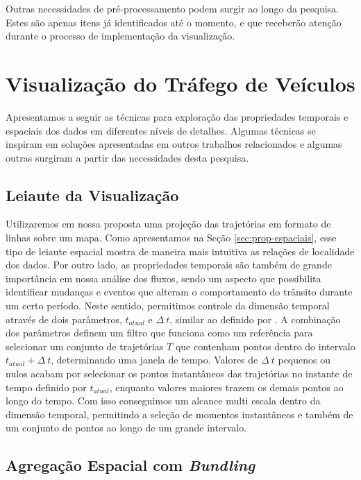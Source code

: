   Outras necessidades de pré-processamento podem surgir ao longo da pesquisa.
Estes são apenas itens já identificados até o momento, e que receberão atenção
durante o processo de implementação da visualização.

\section{Visualização do Tráfego de Veículos}

  Apresentamos a seguir as técnicas para exploração das propriedades temporais
e espaciais dos dados em diferentes níveis de detalhes. Algumas técnicas se
inspiram em soluções apresentadas em outros trabalhos relacionados e algumas
outras surgiram a partir das necessidades desta pesquisa.

\subsection{Leiaute da Visualização}
  
  Utilizaremos em nossa proposta uma projeção das trajetórias em formato de
linhas sobre um mapa.  Como apresentamos na Seção \ref{sec:prop-espaciais},
esse tipo de leiaute espacial mostra de maneira mais intuitiva as relações de
localidade dos dados. Por outro lado, as propriedades temporais são também de
grande importância em nossa análise dos fluxos, sendo um aspecto que
possibilita identificar mudanças e eventos que alteram o comportamento do
trânsito durante um certo período.  Neste sentido, permitimos controle da
dimensão temporal através de dois parâmetros, $t_{atual}$ e $\Delta~t$, similar
ao definido por \citet{Klein2013}.  A combinação dos parâmetros definem um
filtro que funciona como um referência para selecionar um conjunto de
trajetórias  ${T}$ que contenham pontos dentro do intervalo $t_{atual} +
\Delta~t$, determinando uma janela de tempo. Valores de $\Delta~t$ pequenos ou
nulos acabam por selecionar os pontos instantâneos das trajetórias no instante
de tempo definido por $t_{atual}$, enquanto valores maiores trazem os demais
pontos ao longo do tempo. Com isso conseguimos um alcance multi escala dentro
da dimensão temporal, permitindo a seleção de momentos instantâneos e também de
um conjunto de pontos ao longo de um grande intervalo.

\subsection{Agregação Espacial com \emph{Bundling}}

